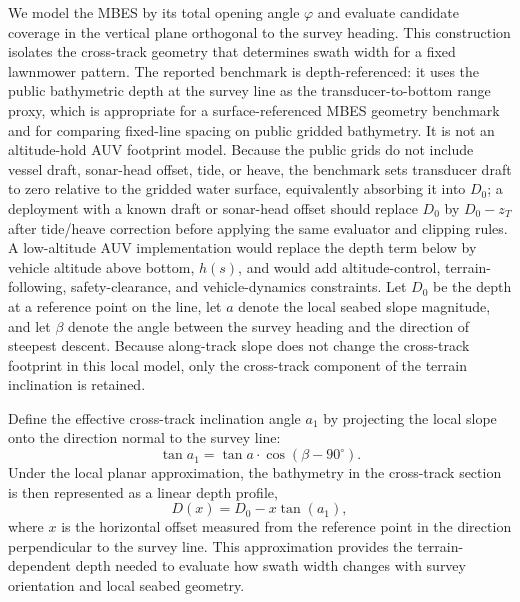 \documentclass[jmse,article,submit,moreauthors]{Definitions/mdpi}
\begin{document}
We model the MBES by its total opening angle $\varphi$ and evaluate candidate coverage in the vertical plane orthogonal to the survey heading. This construction isolates the cross-track geometry that determines swath width for a fixed lawnmower pattern. The reported benchmark is depth-referenced: it uses the public bathymetric depth at the survey line as the transducer-to-bottom range proxy, which is appropriate for a surface-referenced MBES geometry benchmark and for comparing fixed-line spacing on public gridded bathymetry. It is not an altitude-hold AUV footprint model. Because the public grids do not include vessel draft, sonar-head offset, tide, or heave, the benchmark sets transducer draft to zero relative to the gridded water surface, equivalently absorbing it into \(D_0\); a deployment with a known draft or sonar-head offset should replace \(D_0\) by \(D_0-z_T\) after tide/heave correction before applying the same evaluator and clipping rules. A low-altitude AUV implementation would replace the depth term below by vehicle altitude above bottom, \(h(s)\), and would add altitude-control, terrain-following, safety-clearance, and vehicle-dynamics constraints. Let $D_0$ be the depth at a reference point on the line, let $a$ denote the local seabed slope magnitude, and let $\beta$ denote the angle between the survey heading and the direction of steepest descent. Because along-track slope does not change the cross-track footprint in this local model, only the cross-track component of the terrain inclination is retained.

Define the effective cross-track inclination angle $a_1$ by projecting the local slope onto the direction normal to the survey line:
\begin{equation}
\tan a_1 = \tan a \cdot \cos(\beta - 90^{\circ}).
\end{equation}
Under the local planar approximation, the bathymetry in the cross-track section is then represented as a linear depth profile,
\begin{equation}
D(x) = D_0 - x \tan(a_1),
\label{eq:depth}
\end{equation}
where $x$ is the horizontal offset measured from the reference point in the direction perpendicular to the survey line. This approximation provides the terrain-dependent depth needed to evaluate how swath width changes with survey orientation and local seabed geometry.
\end{document}
